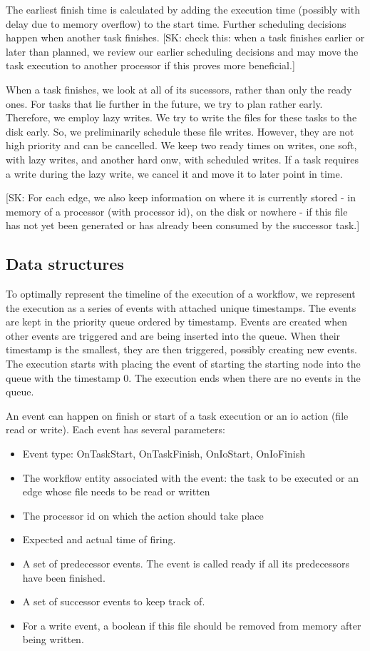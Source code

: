 \documentclass[conference]{IEEEtran}
\newcommand{\skug}[1]{{\color{blue}[SK: #1]}}
\begin{document}
    The earliest finish time is calculated by adding the execution time (possibly with delay due to memory overflow) to the start time.
    Further scheduling decisions happen when another task finishes.
    \skug{check this: when a task finishes earlier or later than planned, we review our earlier scheduling decisions and may
    move the task execution to another processor if this proves more beneficial.}

    When a task finishes, we look at all of its sucessors, rather than only the ready ones.
    For tasks that lie further in the future, we try to plan rather early.
    Therefore, we employ lazy writes.
    We try to write the files for these tasks to the disk early.
    So, we preliminarily schedule these file writes. However, they are not high priority and can be cancelled.
    We keep two ready times on writes, one soft, with lazy writes, and another hard onw, with scheduled writes.
    If a task requires a write during the lazy write, we cancel it and move it to later point in time.

    \skug{For each edge, we also keep information on where it is currently stored - in memory of a processor (with processor id),
        on the disk or nowhere - if this file has not yet been generated or has already been consumed by the successor task.}

\subsection{Data structures }
    To optimally represent the timeline of the execution of a workflow, we represent the execution as a series of events
    with attached unique timestamps.
    The events are kept in the priority queue ordered by timestamp.
    Events are created when other events are triggered and are being inserted into the queue.
    When their timestamp is the smallest, they are then triggered, possibly creating new events.
    The execution starts with placing the event of starting the starting node into the queue with the timestamp 0.
    The execution ends when there are no events in the queue.

    An event can happen on finish or start of a task execution or an io action (file read or write).
    Each event has several parameters:
    \begin{itemize}
        \item Event type: OnTaskStart, OnTaskFinish, OnIoStart, OnIoFinish
        \item The workflow entity associated with the event: the task to be executed or an edge whose file needs to be read or written
        \item The processor id on which the action should take place
        \item Expected and actual time of firing.
        \item A set of predecessor events. The event is called ready if all its predecessors have been finished.
        \item A set of successor events to keep track of.
        \item For a write event, a boolean if this file should be removed from memory after being written.
    \end{itemize}
\end{document}
